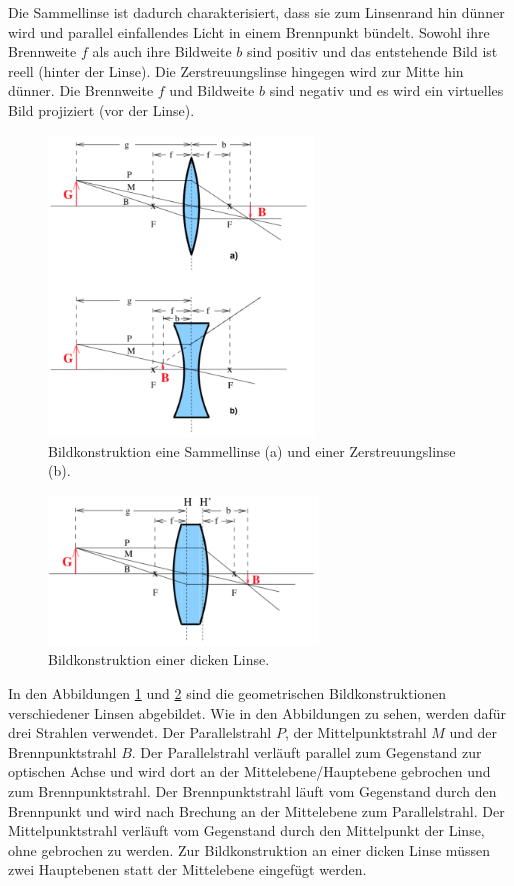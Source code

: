 Die Sammellinse ist dadurch charakterisiert, dass sie zum Linsenrand hin dünner wird und parallel einfallendes Licht in einem Brennpunkt bündelt. Sowohl ihre Brennweite $f$ als auch ihre Bildweite $b$ sind positiv und das entstehende Bild ist reell (hinter der Linse).
Die Zerstreuungslinse hingegen wird zur Mitte hin dünner. Die Brennweite $f$ und Bildweite $b$ sind negativ und es wird ein virtuelles Bild projiziert (vor der Linse). 
\begin{figure}[h]
  \centering
  \includegraphics[height=8cm]{Theorie/Linsen.pdf}
  \caption{Bildkonstruktion eine Sammellinse (a) und einer Zerstreuungslinse (b).}
  \label{fig:Linsen}
\end{figure}
\begin{figure}[h]
  \centering
  \includegraphics[height=4cm]{Theorie/dLinsen.pdf}
  \caption{Bildkonstruktion einer dicken Linse.}
  \label{fig:dLinsen}
\end{figure}
In den Abbildungen \ref{fig:Linsen} und \ref{fig:dLinsen} sind die geometrischen Bildkonstruktionen verschiedener Linsen abgebildet. Wie in den Abbildungen zu sehen, werden dafür drei Strahlen verwendet. Der Parallelstrahl $P$, der Mittelpunktstrahl $M$ und der Brennpunktstrahl $B$. Der Parallelstrahl verläuft parallel zum Gegenstand zur optischen Achse und wird dort an der Mittelebene/Hauptebene gebrochen und zum Brennpunktstrahl. Der Brennpunktstrahl läuft vom Gegenstand durch den Brennpunkt und wird nach Brechung an der Mittelebene zum Parallelstrahl. Der Mittelpunktstrahl verläuft vom Gegenstand durch den Mittelpunkt der Linse, ohne gebrochen zu werden. 
Zur Bildkonstruktion an einer dicken Linse müssen zwei Hauptebenen statt der Mittelebene eingefügt werden. \\

